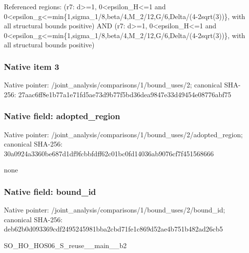 \documentclass[10pt,a4paper]{article}
\begin{document}
\begingroup\raggedright\sloppy Referenced regions:\allowbreak{} (r7:\allowbreak{} d>=\allowbreak{}1,\allowbreak{} 0<epsilon\_\allowbreak{}H<=\allowbreak{}1 and 0<epsilon\_\allowbreak{}g<=\allowbreak{}min\{1,\allowbreak{}sigma\_\allowbreak{}1/\allowbreak{}8,\allowbreak{}beta/\allowbreak{}4,\allowbreak{}M\_\allowbreak{}2/\allowbreak{}12,\allowbreak{}G/\allowbreak{}6,\allowbreak{}Delta/\allowbreak{}(4-2sqrt(3))\},\allowbreak{} with all structural bounds positive) AND (r7:\allowbreak{} d>=\allowbreak{}1,\allowbreak{} 0<epsilon\_\allowbreak{}H<=\allowbreak{}1 and 0<epsilon\_\allowbreak{}g<=\allowbreak{}min\{1,\allowbreak{}sigma\_\allowbreak{}1/\allowbreak{}8,\allowbreak{}beta/\allowbreak{}4,\allowbreak{}M\_\allowbreak{}2/\allowbreak{}12,\allowbreak{}G/\allowbreak{}6,\allowbreak{}Delta/\allowbreak{}(4-2sqrt(3))\},\allowbreak{} with all structural bounds positive)\par\endgroup

\subsubsection{Native item 3}
Native pointer: /joint\_\allowbreak{}analysis/comparisons/1/bound\_\allowbreak{}uses/2; canonical SHA-256: 27aac6ff8e1b77a1e71fd5ae73d9b77f5bd36dea9847e33d49454e08776abf75

\subsubsection{Native field: adopted\_\allowbreak{}region}
Native pointer: /joint\_\allowbreak{}analysis/comparisons/1/bound\_\allowbreak{}uses/2/adopted\_\allowbreak{}region; canonical SHA-256: 30a0924a3360be687d1df9fcbbfdff62c01bc0fd14036ab9076cf7f451568666

\begingroup\raggedright\sloppy none\par\endgroup

\subsubsection{Native field: bound\_\allowbreak{}id}
Native pointer: /joint\_\allowbreak{}analysis/comparisons/1/bound\_\allowbreak{}uses/2/bound\_\allowbreak{}id; canonical SHA-256: deb62b0d093369cdf2495245981bba2cbd71fe1c869d52ae4b751b482ad26cb5

\begingroup\raggedright\sloppy SO\_\allowbreak{}HO\_\allowbreak{}HOS06\_\allowbreak{}S\_\allowbreak{}reuse\_\allowbreak{}\_\allowbreak{}main\_\allowbreak{}\_\allowbreak{}b2\par\endgroup
\end{document}
